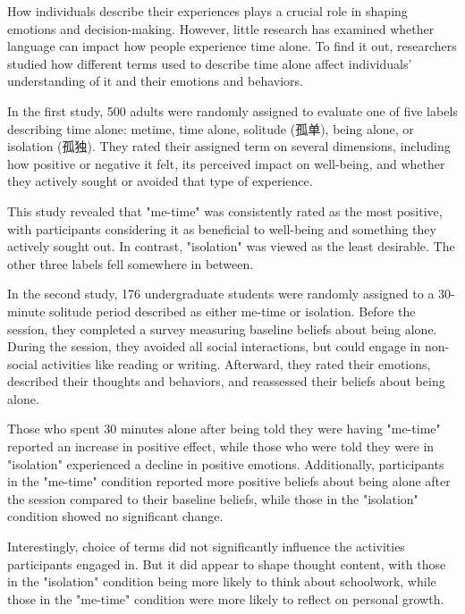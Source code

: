 \documentclass{英语试卷}
\begin{document}
\par How individuals describe their experiences plays a crucial role in shaping emotions and decision-making. However, little research has examined whether language can impact how people experience time alone. To find it out, researchers studied how different terms used to describe time alone affect individuals' understanding of it and their emotions and behaviors.\par
\par In the first study, 500 adults were randomly assigned to evaluate one of five labels describing time alone: metime, time alone, solitude (孤单), being alone, or isolation (孤独). They rated their assigned term on several dimensions, including how positive or negative it felt, its perceived impact on well-being, and whether they actively sought or avoided that type of experience.\par
\par This study revealed that "me-time" was consistently rated as the most positive, with participants considering it as beneficial to well-being and something they actively sought out. In contrast, "isolation" was viewed as the least desirable. The other three labels fell somewhere in between.\par
\par In the second study, 176 undergraduate students were randomly assigned to a 30-minute solitude period described as either me-time or isolation. Before the session, they completed a survey measuring baseline beliefs about being alone. During the session, they avoided all social interactions, but could engage in non-social activities like reading or writing. Afterward, they rated their emotions, described their thoughts and behaviors, and reassessed their beliefs about being alone.\par
\par Those who spent 30 minutes alone after being told they were having "me-time" reported an increase in positive effect, while those who were told they were in "isolation" experienced a decline in positive emotions. Additionally, participants in the "me-time" condition reported more positive beliefs about being alone after the session compared to their baseline beliefs, while those in the "isolation" condition showed no significant change.\par
\par Interestingly, choice of terms did not significantly influence the activities participants engaged in. But it did appear to shape thought content, with those in the "isolation" condition being more likely to think about schoolwork, while those in the "me-time" condition were more likely to reflect on personal growth.\par
\end{document}
